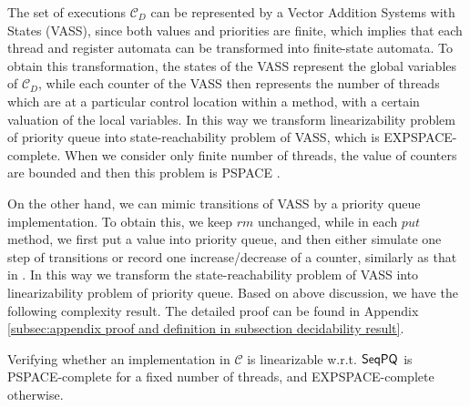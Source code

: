 {\color{red} The set of executions $\mathcal{C}_D$ can be represented by a Vector Addition Systems with States (VASS), since both values and priorities are finite, which implies that each thread and register automata can be transformed into finite-state automata. To obtain this transformation, the states of the VASS represent the global variables of $\mathcal{C}_D$, while each counter of the VASS then represents the number of threads which are at a particular control location within a method, with a certain valuation of the local variables. In this way we transform linearizability problem of priority queue into state-reachability problem of VASS, which is EXPSPACE-complete. When we consider only finite number of threads, the value of counters are bounded and then this problem is PSPACE \cite{DBLP:conf/ac/Esparza96}.

On the other hand, we can mimic transitions of VASS by a priority queue implementation. To obtain this, we keep $\textit{rm}$ unchanged, while in each $\textit{put}$ method, we first put a value into priority queue, and then either simulate one step of transitions or record one increase/decrease of a counter, similarly as that in \cite{conf/esop/BouajjaniEEH13}. In this way we transform the state-reachability problem of VASS into linearizability problem of priority queue. Based on above discussion, we have the following complexity result. The detailed proof can be found in Appendix \ref{subsec:appendix proof and definition in subsection decidability result}.}




\begin{theorem}
\label{theorem:complexity of priority queue}
Verifying whether an implementation in $\mathcal{C}$ is linearizable w.r.t. $\mathsf{SeqPQ}$ is PSPACE-complete for a fixed number of threads, and EXPSPACE-complete otherwise.
\end{theorem}




